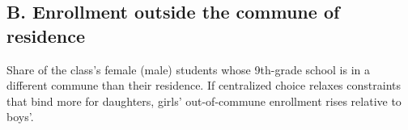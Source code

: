 \documentclass[
]{article}
\begin{document}
\begin{table}[htbp]
   \caption{Effect on Share of Female Students}\label{tab: share female by school type}
   \centerline{}
\end{table}

\hypertarget{b.-enrollment-outside-the-commune-of-residence}{%
\subsection{B. Enrollment outside the commune of
residence}\label{b.-enrollment-outside-the-commune-of-residence}}

Share of the class's female (male) students whose 9th-grade school is in
a different commune than their residence. If centralized choice relaxes
constraints that bind more for daughters, girls' out-of-commune
enrollment rises relative to boys'.

\begin{table}[htbp]
   \caption{Enrollment Outside the Commune of Residence by Gender}\label{tab: gender out of commune}
   \centerline{}
\end{table}
\end{document}
